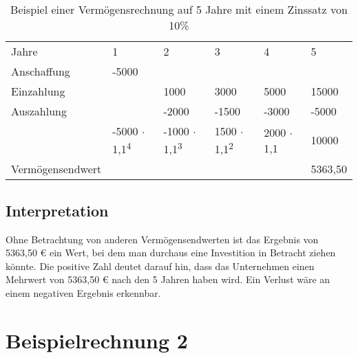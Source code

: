 \begin{table}[!h]
    \begin{tabular}{llllll}
        \cline{1-6} \rowcolor{gray}
        Jahre            & 1                                    & 2                                    & 3                                   & 4                & 5       \\ \cline{1-6} \rowcolor{white}
        Anschaffung      & -5000                                &                                      &                                     &                  &         \\ \cline{1-6} \rowcolor{white}
        Einzahlung       &                                      & 1000                                 & 3000                                & 5000             & 15000   \\ \cline{1-6} \rowcolor{white}
        Auszahlung       &                                      & -2000                                & -1500                               & -3000            & -5000   \\ \cline{1-6} \rowcolor{white}
                         & -5000 $\cdot$ 1,1\textsuperscript{4} & -1000 $\cdot$ 1,1\textsuperscript{3} & 1500 $\cdot$ 1,1\textsuperscript{2} & 2000 $\cdot$ 1,1 & 10000   \\ \rowcolor{white}
        Vermögensendwert &                                      &                                      &                                     &                  & 5363,50 \\ \cline{1-6}
    \end{tabular}
    \caption{Beispiel einer Vermögensrechnung auf 5 Jahre mit einem Zinssatz von 10\%}
    \label{tb:VermoegensendwertRechnung}
\end{table}

\subsection{Interpretation}

Ohne Betrachtung von anderen Vermögensendwerten ist das Ergebnis von 5363,50 € ein Wert, bei dem man durchaus eine Investition in Betracht ziehen könnte. Die positive Zahl deutet darauf hin, dass das Unternehmen einen Mehrwert von 5363,50 € nach den 5 Jahren haben wird. Ein Verlust wäre an einem negativen Ergebnis erkennbar.

\section{Beispielrechnung 2}\label{beispielrechnungVer}

